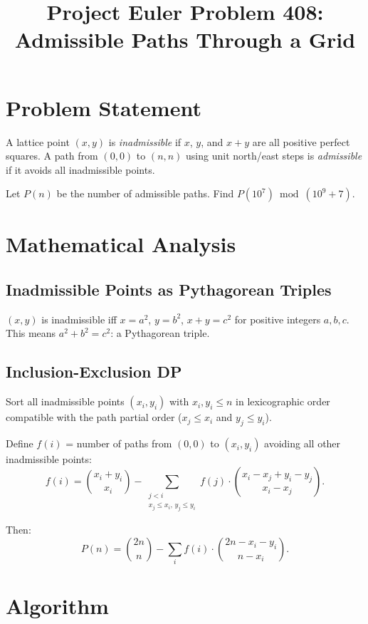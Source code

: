 \documentclass[11pt]{article}
\title{Project Euler Problem 408: Admissible Paths Through a Grid}
\author{}
\date{}
\begin{document}
\maketitle

\section{Problem Statement}

A lattice point $(x, y)$ is \emph{inadmissible} if $x$, $y$, and $x + y$ are all positive perfect squares.
A path from $(0,0)$ to $(n,n)$ using unit north/east steps is \emph{admissible} if it avoids all inadmissible points.

Let $P(n)$ be the number of admissible paths. Find $P(10^7) \bmod (10^9 + 7)$.

\section{Mathematical Analysis}

\subsection{Inadmissible Points as Pythagorean Triples}

$(x,y)$ is inadmissible iff $x = a^2$, $y = b^2$, $x + y = c^2$ for positive integers $a, b, c$.
This means $a^2 + b^2 = c^2$: a Pythagorean triple.

\subsection{Inclusion-Exclusion DP}

Sort all inadmissible points $(x_i, y_i)$ with $x_i, y_i \le n$ in lexicographic order compatible
with the path partial order ($x_j \le x_i$ and $y_j \le y_i$).

Define $f(i)$ = number of paths from $(0,0)$ to $(x_i, y_i)$ avoiding all other inadmissible points:
\[
  f(i) = \binom{x_i + y_i}{x_i}
       - \sum_{\substack{j < i \\ x_j \le x_i,\, y_j \le y_i}}
         f(j) \cdot \binom{x_i - x_j + y_i - y_j}{x_i - x_j}.
\]

Then:
\[
  P(n) = \binom{2n}{n}
       - \sum_{i} f(i) \cdot \binom{2n - x_i - y_i}{n - x_i}.
\]

\section{Algorithm}
\end{document}
